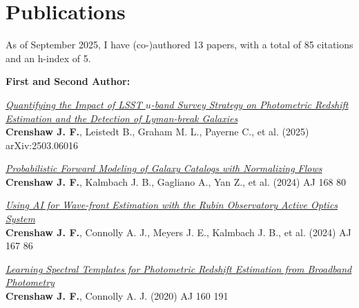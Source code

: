 \section{Publications}

As of September 2025, I have (co-)authored 13 papers, with a total of 85 citations and an h-index of 5. \vspace{2mm}

\textbf{First and Second Author:}
\begin{etaremune}
\item \href{https://ui.adsabs.harvard.edu/abs/2025arXiv250306016C}{\textit{Quantifying the Impact of LSST $u$-band Survey Strategy on Photometric Redshift Estimation and the Detection of Lyman-break Galaxies}} \\ 
\textbf{Crenshaw J. F.}, Leistedt B., Graham M. L., Payerne C., et al. (2025) 
arXiv:2503.06016 

\item \href{https://ui.adsabs.harvard.edu/abs/2024AJ....168...80C}{\textit{Probabilistic Forward Modeling of Galaxy Catalogs with Normalizing Flows}} \\ 
\textbf{Crenshaw J. F.}, Kalmbach J. B., Gagliano A., Yan Z., et al. (2024) 
AJ 168 80 

\item \href{https://ui.adsabs.harvard.edu/abs/2024AJ....167...86C}{\textit{Using AI for Wave-front Estimation with the Rubin Observatory Active Optics System}} \\ 
\textbf{Crenshaw J. F.}, Connolly A. J., Meyers J. E., Kalmbach J. B., et al. (2024) 
AJ 167 86 

\item \href{https://ui.adsabs.harvard.edu/abs/2020AJ....160..191C}{\textit{Learning Spectral Templates for Photometric Redshift Estimation from Broadband Photometry}} \\ 
\textbf{Crenshaw J. F.}, Connolly A. J. (2020) 
AJ 160 191 

\end{etaremune}

